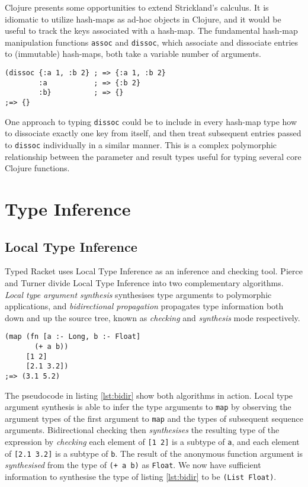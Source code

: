 \documentclass[12pt, a4paper]{article}
\begin{document}
Clojure presents some opportunities to extend Strickland's calculus. It is idiomatic
to utilize hash-maps as ad-hoc objects in Clojure, and it would be useful to track the keys associated
with a hash-map.  The fundamental hash-map manipulation functions \lstinline|assoc| and \lstinline|dissoc|,
which associate and dissociate entries to (immutable) hash-maps, both take a variable number of arguments.

\begin{lstlisting}[caption=Using \lstinline|dissoc| with variable arguments, label=lst:assoc1]
(dissoc {:a 1, :b 2} ; => {:a 1, :b 2}
        :a           ; => {:b 2}
        :b}          ; => {}
;=> {}
\end{lstlisting}

One approach to typing \lstinline|dissoc| could be to include in every hash-map type how to dissociate exactly one
key from itself, and then treat subsequent entries passed to \lstinline|dissoc| individually in a similar manner.
This is a complex polymorphic relationship between the parameter and result types useful for typing
several core Clojure functions.

\section{Type Inference}

\subsection{Local Type Inference}

Typed Racket uses Local Type Inference \cite{Pierce:2000:LTI:345099.345100}
as an inference and checking tool. Pierce and Turner
\cite{Pierce:2000:LTI:345099.345100} divide Local Type Inference into
two complementary algorithms. \emph{Local type argument synthesis}
synthesises type arguments to polymorphic applications, and \emph{bidirectional
propagation} propagates type information both down and up the source tree,
known as \emph{checking} and \emph{synthesis} mode respectively.

\begin{lstlisting}[caption=Bidirectional checking algorithm with Typed Clojure pseudocode, label=lst:bidir]
(map (fn [a :- Long, b :- Float]
       (+ a b))
     [1 2]
     [2.1 3.2])
;=> (3.1 5.2)
\end{lstlisting}

The pseudocode in listing \ref{lst:bidir} show both algorithms in action. Local type argument synthesis is able
to infer the type arguments to \lstinline|map| by observing the argument types of the first
argument to \lstinline|map| and the types of subsequent sequence arguments. Bidirectional checking
then \emph{synthesises} the resulting type of the expression by \emph{checking} each element
of \lstinline|[1 2]| is a subtype of \lstinline|a|, and each element of \lstinline|[2.1 3.2]| is a subtype of
\lstinline|b|. The result of the anonymous function argument is \emph{synthesised} from the type of
\lstinline|(+ a b)| as \lstinline|Float|. We now have sufficient information to 
synthesise the type of listing \ref{lst:bidir} to be \lstinline|(List Float)|.
\end{document}
